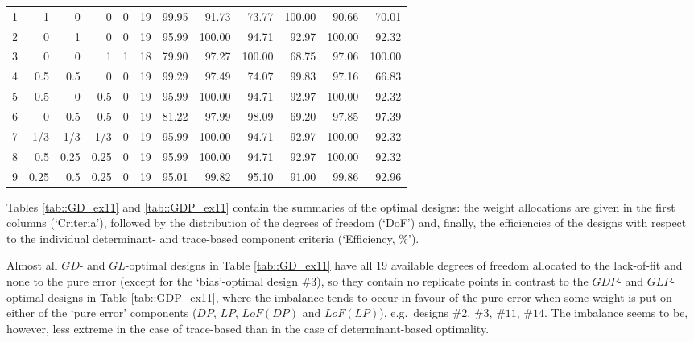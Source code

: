 \begin{table}[h]
{\begin{tabular}{rrrrrrrrrrrr}
1 & 1 & 0 & 0 & \multicolumn{1}{|r}{0} & 19 & \multicolumn{1}{|r}{99.95} & 91.73 & 73.77 & \multicolumn{1}{|r}{100.00} & 90.66 & 70.01 \\
2 & 0 & 1 & 0 & \multicolumn{1}{|r}{0} & 19 & \multicolumn{1}{|r}{95.99} & 100.00 & 94.71 & \multicolumn{1}{|r}{92.97} & 100.00 & 92.32 \\
3 & 0 & 0 & 1 & \multicolumn{1}{|r}{1} & 18 & \multicolumn{1}{|r}{79.90} & 97.27 & 100.00 & \multicolumn{1}{|r}{68.75} & 97.06 & 100.00 \\
4 & 0.5 & 0.5 & 0 & \multicolumn{1}{|r}{0} & 19 & \multicolumn{1}{|r}{99.29} & 97.49 & 74.07 & \multicolumn{1}{|r}{99.83} & 97.16 & 66.83 \\
5 & 0.5 & 0 & 0.5 & \multicolumn{1}{|r}{0} & 19 & \multicolumn{1}{|r}{95.99} & 100.00 & 94.71 & \multicolumn{1}{|r}{92.97} & 100.00 & 92.32 \\
6 & 0 & 0.5 & 0.5 & \multicolumn{1}{|r}{0} & 19 & \multicolumn{1}{|r}{81.22} & 97.99 & 98.09 & \multicolumn{1}{|r}{69.20} & 97.85 & 97.39 \\
7 & 1/3 & 1/3 & 1/3 & \multicolumn{1}{|r}{0} & 19 & \multicolumn{1}{|r}{95.99} & 100.00 & 94.71 & \multicolumn{1}{|r}{92.97} & 100.00 & 92.32 \\
8 & 0.5 & 0.25 & 0.25 & \multicolumn{1}{|r}{0} & 19 & \multicolumn{1}{|r}{95.99} & 100.00 & 94.71 & \multicolumn{1}{|r}{92.97} & 100.00 & 92.32 \\
9 & 0.25 & 0.5 & 0.25 & \multicolumn{1}{|r}{0} & 19 & \multicolumn{1}{|r}{95.01} & 99.82 & 95.10 & \multicolumn{1}{|r}{91.00} & 99.86 & 92.96
\end{tabular}
}
\end{table}

Tables \ref{tab::GD_ex11} and \ref{tab::GDP_ex11} contain the summaries of the optimal designs: the weight allocations are given in the first columns (`Criteria'), followed by the distribution of the degrees of freedom (`DoF') and, finally, the efficiencies of the designs with respect to the individual determinant- and trace-based component criteria (`Efficiency, $\%$').

Almost all $GD$- and $GL$-optimal designs in Table \ref{tab::GD_ex11} have all $19$ available degrees of freedom allocated to the lack-of-fit and none to the pure error (except for the `bias'-optimal design \#$3$), so they contain no replicate points in contrast to the $GDP$- and $GLP$-optimal designs in Table \ref{tab::GDP_ex11}, where the imbalance tends to occur in favour of the pure error when some weight is put on either of the `pure error' components ($DP$, $LP$, $LoF(DP)$ and $LoF(LP)$), e.g.~designs \#$2$, \#$3$, \#$11$, \#$14$. The imbalance seems to be, however, less extreme in the case of trace-based than in the case of determinant-based optimality.

